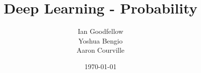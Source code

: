 \documentclass[lualatex]{beamer}
\title[Deep Learning]{Deep Learning - Probability}
\author{Ian Goodfellow\texorpdfstring{\\ Yoshua Bengio \\ Aaron Courville}{ and Yoshua Bengio and Aaron Courville}}
\date{\today}
\numberwithin{equation}{section}
\begin{document}
\begin{frame}
  \titlepage
\end{frame}


% 
\end{document}
